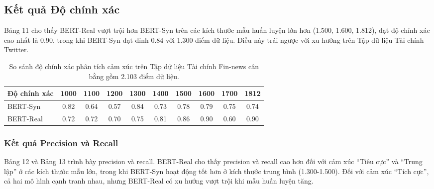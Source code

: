 \documentclass[a4paper,10pt]{article}
\begin{document}
\subsection{Kết quả Độ chính xác} 

Bảng 11 cho thấy BERT-Real vượt trội hơn BERT-Syn trên các kích thước mẫu huấn luyện lớn hơn (1.500, 1.600, 1.812), đạt độ chính xác cao nhất là 0.90, trong khi BERT-Syn đạt đỉnh 0.84 với 1.300 điểm dữ liệu. Điều này trái ngược với xu hướng trên Tập dữ liệu Tài chính Twitter.

\begin{table}[h]
    \renewcommand{\thetable}{11} %
    \centering
    \caption{So sánh độ chính xác phân tích cảm xúc trên Tập dữ liệu Tài chính Fin-news cân bằng gồm 2.103 điểm dữ liệu.}
    \label{tab:accuracy_comparison}
    \begin{tabular}{lccccccccc}
        \hline
        Độ chính xác & 1000 & 1100 & 1200 & 1300 & 1400 & 1500 & 1600 & 1700 & 1812 \\
        \hline
        BERT-Syn  & 0.82 & 0.64 & 0.57 & 0.84 & 0.73 & 0.78 & 0.79 & 0.75 & 0.74 \\
        BERT-Real & 0.72 & 0.72 & 0.70 & 0.75 & 0.81 & 0.86 & 0.90 & 0.60 & 0.90 \\
        \hline
    \end{tabular}
\end{table}



\subsubsection{ Kết quả Precision và Recall}

Bảng 12 và Bảng 13 trình bày precision và recall. BERT-Real cho thấy precision và recall cao hơn đối với cảm xúc “Tiêu cực” và “Trung lập” ở các kích thước mẫu lớn, trong khi BERT-Syn hoạt động tốt hơn ở kích thước trung bình (1.300-1.500). Đối với cảm xúc “Tích cực”, cả hai mô hình cạnh tranh nhau, nhưng BERT-Real có xu hướng vượt trội khi mẫu huấn luyện tăng.
\end{document}
